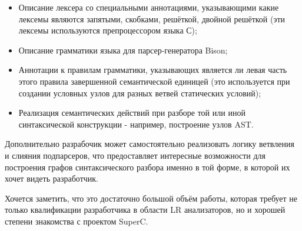 \begin{itemize}
\item Описание лексера со специальными аннотациями, указывающими какие лексемы являются запятыми, скобками, решёткой, двойной решёткой (эти лексемы используются препроцессором языка С);
\item Описание грамматики языка для парсер-генератора Bison;
\item Аннотации к правилам грамматики, указывающих является ли левая часть этого правила завершенной семантической единицей (это используется при создании условных узлов для разных ветвей статических условий);
\item Реализация семантических действий при разборе той или иной синтаксической конструкции - например, построение узлов AST.
\end{itemize}

Дополнительно разрабочик может самостоятельно реализовать логику ветвления и слияния подпарсеров, что предоставляет интересные возможности для построения графов синтаксического разбора именно в той форме, в которой их хочет видеть разработчик.

Хочется заметить, что это достаточно большой объём работы, которая требует не только квалификации разработчика в области LR анализаторов, но и хорошей степени знакомства с проектом SuperC.
